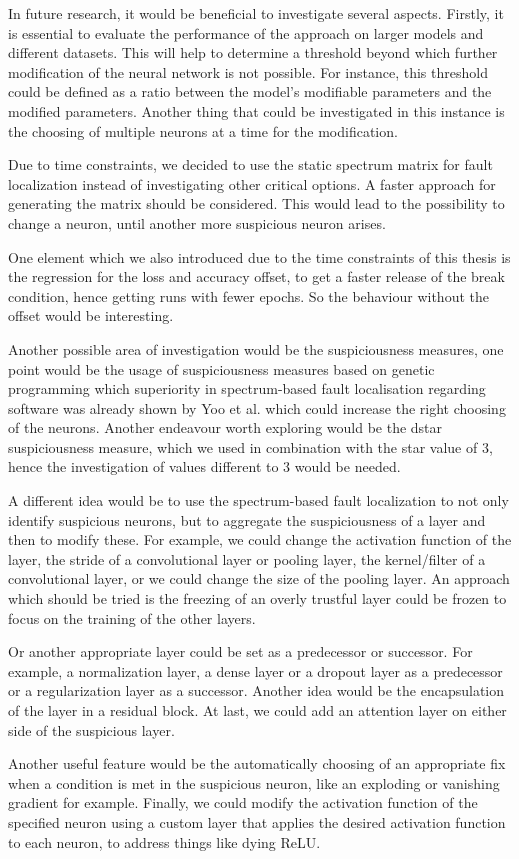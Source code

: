 In future research, it would be beneficial to investigate several aspects.
Firstly, it is essential to evaluate the performance of the approach on larger models and different datasets.
This will help to determine a threshold beyond which further modification of the neural network is not possible.
For instance, this threshold could be defined as a ratio between the model's modifiable parameters and the modified parameters.
Another thing that could be investigated in this instance is the choosing of multiple neurons at a time for the modification.

Due to time constraints, we decided to use the static spectrum matrix for fault localization instead of investigating other critical options.
A faster approach for generating the matrix should be considered.
This would lead to the possibility to change a neuron, until another more suspicious neuron arises.

One element which we also introduced due to the time constraints of this thesis is the regression for the loss and accuracy offset, to get a faster release of the break condition, hence getting runs with fewer epochs.
So the behaviour without the offset would be interesting.

Another possible area of investigation would be the suspiciousness measures, one point would be the usage of suspiciousness measures based on genetic programming which superiority in spectrum-based fault localisation regarding software was already shown by Yoo et al. \cite{yoo_human_2017} which could increase the right choosing of the neurons.
Another endeavour worth exploring would be the dstar suspiciousness measure, which we used in combination with the star value of 3, hence the investigation of values different to 3 would be needed.

A different idea would be to use the spectrum-based fault localization to not only identify suspicious neurons, but to aggregate the suspiciousness of a layer and then to modify these.
For example, we could change the activation function of the layer, the stride of a convolutional layer or pooling layer, the kernel/filter of a convolutional layer, or we could change the size of the pooling layer.
An approach which should be tried is the freezing of an overly trustful layer could be frozen to focus on the training of the other layers.

Or another appropriate layer could be set as a predecessor or successor.
For example, a normalization layer, a dense layer or a dropout layer as a predecessor or a regularization layer as a successor.
Another idea would be the encapsulation of the layer in a residual block.
At last, we could add an attention layer on either side of the suspicious layer.

Another useful feature would be the automatically choosing of an appropriate fix when a condition is met in the suspicious neuron, like an exploding or vanishing gradient for example.
Finally, we could modify the activation function of the specified neuron using a custom layer that applies the desired activation function to each neuron, to address things like dying ReLU.